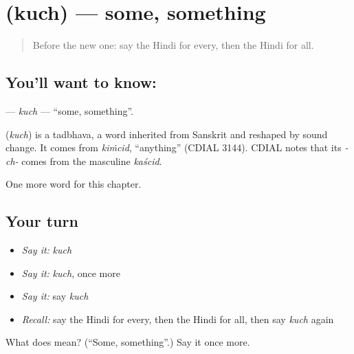 \section[\texorpdfstring{\hi{कुछ} (kuch)}{कुछ (kuch)}]{ (kuch) — some, something}

\label{lesson:HI-C245-kuch}



\begin{quote}
Before the new one: say the Hindi for every, then the Hindi for all.
\end{quote}

\subsection*{You'll want to know: }
\textbf{} — \emph{kuch} — \textquotedblleft{}some, something\textquotedblright{}.

\begin{cousinweb}
\textbf{} (\emph{kuch}) is a tadbhava, a word inherited from Sanskrit and reshaped by sound change. It comes from \emph{kiṁcid}, \textquotedblleft{}anything\textquotedblright{} (CDIAL 3144). CDIAL notes that its \emph{-ch-} comes from the masculine \emph{kaścid}.
\end{cousinweb}

\begin{grammarlens}[title={What you've built}]
One more word for this chapter.
\end{grammarlens}

\subsection*{Your turn}
\begin{itemize}
\raggedright
  \item \emph{Say it:} \emph{kuch}
  \item \emph{Say it:} \emph{kuch}, once more
  \item \emph{Say it:} say \emph{kuch}
  \item \emph{Recall:} say the Hindi for every, then the Hindi for all, then say \emph{kuch} again
\end{itemize}

\begin{tcolorbox}[breakable,colback=teal!4,colframe=teal!35!black,title={Before you move on}]
What does  mean? (\textquotedblleft{}Some, something\textquotedblright{}.) Say it once more.
\end{tcolorbox}
